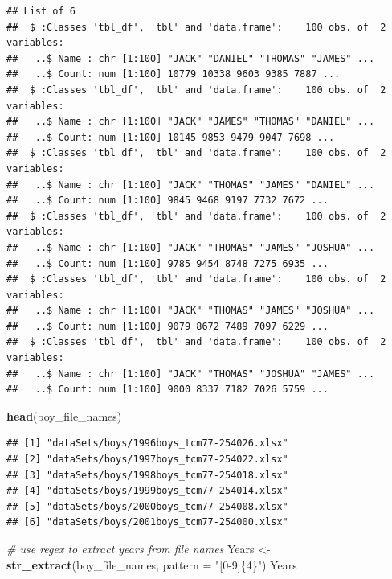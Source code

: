 \documentclass[]{book}
\newenvironment{Shaded}{\begin{snugshade}}{\end{snugshade}}
\newcommand{\CommentTok}[1]{\textcolor[rgb]{0.56,0.35,0.01}{\textit{#1}}}
\newcommand{\DataTypeTok}[1]{\textcolor[rgb]{0.13,0.29,0.53}{#1}}
\newcommand{\KeywordTok}[1]{\textcolor[rgb]{0.13,0.29,0.53}{\textbf{#1}}}
\newcommand{\NormalTok}[1]{#1}
\newcommand{\OperatorTok}[1]{\textcolor[rgb]{0.81,0.36,0.00}{\textbf{#1}}}
\newcommand{\StringTok}[1]{\textcolor[rgb]{0.31,0.60,0.02}{#1}}
\begin{document}
\begin{Shaded}
\end{Shaded}

\begin{verbatim}
## List of 6
##  $ :Classes 'tbl_df', 'tbl' and 'data.frame':    100 obs. of  2 variables:
##   ..$ Name : chr [1:100] "JACK" "DANIEL" "THOMAS" "JAMES" ...
##   ..$ Count: num [1:100] 10779 10338 9603 9385 7887 ...
##  $ :Classes 'tbl_df', 'tbl' and 'data.frame':    100 obs. of  2 variables:
##   ..$ Name : chr [1:100] "JACK" "JAMES" "THOMAS" "DANIEL" ...
##   ..$ Count: num [1:100] 10145 9853 9479 9047 7698 ...
##  $ :Classes 'tbl_df', 'tbl' and 'data.frame':    100 obs. of  2 variables:
##   ..$ Name : chr [1:100] "JACK" "THOMAS" "JAMES" "DANIEL" ...
##   ..$ Count: num [1:100] 9845 9468 9197 7732 7672 ...
##  $ :Classes 'tbl_df', 'tbl' and 'data.frame':    100 obs. of  2 variables:
##   ..$ Name : chr [1:100] "JACK" "THOMAS" "JAMES" "JOSHUA" ...
##   ..$ Count: num [1:100] 9785 9454 8748 7275 6935 ...
##  $ :Classes 'tbl_df', 'tbl' and 'data.frame':    100 obs. of  2 variables:
##   ..$ Name : chr [1:100] "JACK" "THOMAS" "JAMES" "JOSHUA" ...
##   ..$ Count: num [1:100] 9079 8672 7489 7097 6229 ...
##  $ :Classes 'tbl_df', 'tbl' and 'data.frame':    100 obs. of  2 variables:
##   ..$ Name : chr [1:100] "JACK" "THOMAS" "JOSHUA" "JAMES" ...
##   ..$ Count: num [1:100] 9000 8337 7182 7026 5759 ...
\end{verbatim}

\begin{Shaded}
\begin{Highlighting}[]
\KeywordTok{head}\NormalTok{(boy_file_names)}
\end{Highlighting}
\end{Shaded}

\begin{verbatim}
## [1] "dataSets/boys/1996boys_tcm77-254026.xlsx"
## [2] "dataSets/boys/1997boys_tcm77-254022.xlsx"
## [3] "dataSets/boys/1998boys_tcm77-254018.xlsx"
## [4] "dataSets/boys/1999boys_tcm77-254014.xlsx"
## [5] "dataSets/boys/2000boys_tcm77-254008.xlsx"
## [6] "dataSets/boys/2001boys_tcm77-254000.xlsx"
\end{verbatim}

\begin{Shaded}
\begin{Highlighting}[]
\CommentTok{# use regex to extract years from file names}
\NormalTok{Years <-}\StringTok{ }\KeywordTok{str_extract}\NormalTok{(boy_file_names, }\DataTypeTok{pattern =} \StringTok{"[0-9]\{4\}"}\NormalTok{)}
\NormalTok{Years}
\end{Highlighting}
\end{Shaded}
\end{document}
